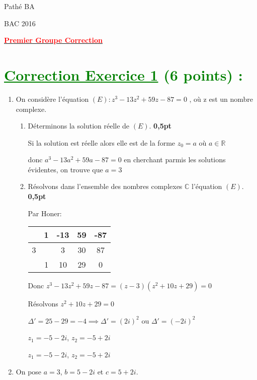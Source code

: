 \documentclass[12pt]{article}
\begin{document}
\begin{minipage}{0.8\textwidth}
	Pathé BA                          
\end{minipage}
\begin{minipage}{0.8\textwidth}
	BAC 2016
\end{minipage}

\begin{center}
\textbf{{\underline{\textcolor{red}{Premier Groupe Correction}}}}
\end{center}
\section*{\textcolor{green}{\underline{Correction Exercice 1} (6 points) :}}
\begin{enumerate}
	\item On considère l’équation $(E): z^{3}-13z^{2}+59z-87=0$ , où z est un nombre complexe.
	\begin{enumerate}
		\item Déterminons la solution réelle de $(E)$.\textbf{ 0,5pt}
		
		Si la solution est réelle alors elle est de la forme $z_{0}=a$ où $a\in \mathbb{R}$
		
		donc $a^{3}-13a^{2}+59a-87=0$ en cherchant parmis les solutions évidentes, on trouve que $a=3$
		
		\item Résolvons dans l’ensemble des nombres complexes $\mathbb{C}$ l’équation $(E)$.\textbf{ 0,5pt}
		
		Par Honer:\\
		\begin{tabular}{|c|c|c|c|c|}
					\hline
					& 1 & -13 & 59 & -87\\
					\hline
					3 &  & 3 & 30 & 87\\
					\hline
					& 1 & 10 & 29 & 0\\
					\hline
		\end{tabular}
		
		Donc $z^{3}-13z^{2}+59z-87=(z-3)(z^{2}+10z+29)=0$
		
		Résolvons $z^{2}+10z+29=0$
		
		$\Delta' = 25-29=-4\implies \Delta'=(2i)^{2}$ ou $\Delta'=(-2i)^{2}$
		
		$z_{1}=-5-2i$, $z_{2}=-5+2i$
		
		$z_{1}=-5-2i$, $z_{2}=-5+2i$
		
		\textcolor{green}{}
	\end{enumerate}
	\item On pose $a = 3$, $b = 5 - 2i$ et $c = 5 + 2i$.
	

\end{enumerate}
\end{document}
